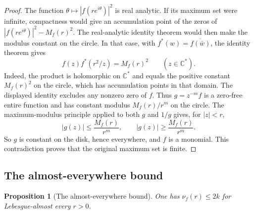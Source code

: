 \documentclass[11pt,reqno]{amsart}
\newtheorem{proposition}[theorem]{Proposition}
\theoremstyle{remark}
\numberwithin{equation}{section}
\newcommand{\C}{\mathbb C}
\newcommand{\Cs}{\C^*}
\begin{document}
\begin{proof}
The function $\theta\mapsto|f(re^{i\theta})|^2$ is real analytic.
If its maximum set were infinite, compactness would give an
accumulation point of the zeros of
$|f(re^{i\theta})|^2-M_f(r)^2$. The real-analytic identity theorem
would then make the modulus constant on the circle. In that case,
with $f^*(w)=\overline{f(\bar w)}$, the identity theorem gives
\[
 f(z)f^*(r^2/z)=M_f(r)^2\qquad(z\in\Cs).
\]
Indeed, the product is holomorphic on $\Cs$ and equals the positive
constant $M_f(r)^2$ on the circle, which has accumulation points in
that domain. The displayed identity excludes any nonzero zero of
$f$. Thus $g=z^{-m}f$ is a zero-free entire function and has constant
modulus $M_f(r)/r^m$ on the circle. The maximum-modulus principle
applied to both $g$ and $1/g$ gives, for $|z|<r$,
\[
 |g(z)|\le\frac{M_f(r)}{r^m},
 \qquad
 |g(z)|\ge\frac{M_f(r)}{r^m}.
\]
So $g$ is constant on the disk, hence everywhere, and $f$ is a
monomial. This contradiction proves that the original maximum
set is finite.
\end{proof}

\subsection{The almost-everywhere bound}
\begin{proposition}[The almost-everywhere bound]\label{prop:ae}
One has $\nu_f(r)\le2k$ for Lebesgue-almost every $r>0$.
\end{proposition}
\end{document}
